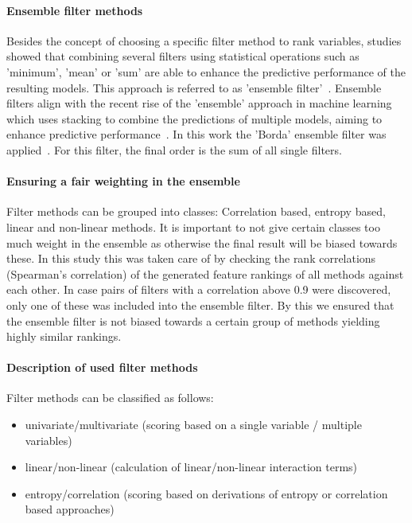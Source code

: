 \documentclass[letterpaper, peerreview]{IEEEtran}
\begin{document}
\paragraph{Ensemble filter methods}

Besides the concept of choosing a specific filter method to rank variables, studies showed that combining several filters using statistical operations such as 'minimum', 'mean' or 'sum' are able to enhance the predictive performance of the resulting models\cite{abeel2010, drotar2017a}.
This approach is referred to as 'ensemble filter'~\cite{dietterich2000}.
Ensemble filters align with the recent rise of the 'ensemble' approach in machine learning which uses stacking to combine the predictions of multiple models, aiming to enhance predictive performance~\cite{polikar2012, feurer2015}.
In this work the 'Borda' ensemble filter was applied~\cite{drotar2017a}.
For this filter, the final order is the sum of all single filters.

\paragraph{Ensuring a fair weighting in the ensemble}

Filter methods can be grouped into classes: Correlation based, entropy based, linear and non-linear methods.
It is important to not give certain classes too much weight in the ensemble as otherwise the final result will be biased towards these.
In this study this was taken care of by checking the rank correlations (Spearman's correlation) of the generated feature rankings of all methods against each other.
In case pairs of filters with a correlation above 0.9 were discovered, only one of these was included into the ensemble filter.
By this we ensured that the ensemble filter is not biased towards a certain group of methods yielding highly similar rankings.

\paragraph{Description of used filter methods}

Filter methods can be classified as follows:

\begin{itemize}
	\item univariate/multivariate (scoring based on a single variable / multiple variables)
	\item linear/non-linear (calculation of linear/non-linear interaction terms)
	\item entropy/correlation (scoring based on derivations of entropy or correlation based approaches)
\end{itemize}
\end{document}
